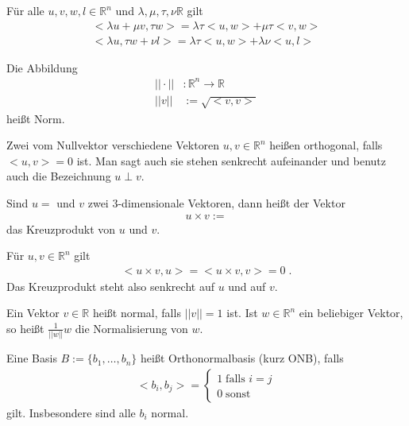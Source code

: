 \begin{Satz}
Für alle $u,v,w,l \in \mathbb{R}^n$ und $\lambda, \mu, \tau, \nu \mathbb{R}$ gilt
\begin{align*}
<\lambda u + \mu v, \tau w> = \lambda \tau<u,w> + \mu \tau <v,w> \\
<\lambda u , \tau w + \nu l> = \lambda \tau<u,w> + \lambda \nu <u,l>
\end{align*}
\end{Satz}
\begin{Definition}
Die Abbildung 
\begin{align*}
|| \cdot || &: \mathbb{R}^n  \to \mathbb{R} \\
||v||  &:= \sqrt{<v,v>} 
\end{align*}  
heißt Norm.
\end{Definition}

\begin{Definition}
Zwei vom Nullvektor verschiedene Vektoren $u,v \in \mathbb{R}^n$ heißen orthogonal, falls $<u,v> = 0$ ist. 
Man sagt auch sie stehen senkrecht aufeinander und benutz auch die Bezeichnung $u \perp v$. 
\end{Definition}

\begin{Definition}
Sind $u = $ und $v$ zwei $3$-dimensionale Vektoren, dann heißt der Vektor
\begin{align*}
u \times v := 
\end{align*}
 das Kreuzprodukt von $u$ und $v$.
\end{Definition}

\begin{Bemerkung}
Für $u , v \in \mathbb{R}^n$ gilt
\begin{align*}
<u \times v, u> = <u \times v, v> = 0 \; . 
\end{align*}
Das Kreuzprodukt steht also senkrecht auf $u$ und auf $v$.
\end{Bemerkung}

\begin{Definition}
Ein Vektor $v \in \mathbb{R}$ heißt normal, falls $||v|| = 1$ ist.
Ist $w \in \mathbb{R}^n$ ein beliebiger Vektor, so heißt $\frac{1}{||w||} w$ die Normalisierung von $w$.
\end{Definition}

\begin{Definition}
Eine Basis  $B:= \{ b_1, \hdots , b_n \}$ heißt Orthonormalbasis (kurz ONB), falls 
\begin{align*}
<b_i, b_j> = \begin{cases}  1 \; \text{falls }  i = j  \\ 0 \; \text{sonst}\end{cases}
\end{align*}
gilt. Insbesondere sind alle $b_i$ normal.
\end{Definition}

